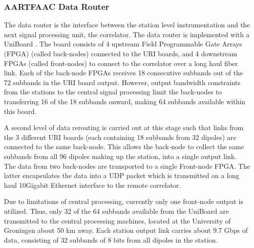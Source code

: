 \documentclass{ws-jai}
\begin{document}
\subsubsection {\label {sec:afaac_unb} AARTFAAC  Data Router}
The data router  is the interface between the station  level instrumentation and
the next signal processing unit, the correlator.  The data router is implemented
with a UniBoard \citep{gunst2014application}.  The  board consists of 4 upstream
Field Programmable Gate  Arrays (FPGA) (called back-nodes) connected  to the URI
boards, and 4 downstream FPGAs (called front-nodes) to connect to the correlator
over  a  long  haul  fiber  link.   Each of  the  back-node  FPGAs  receives  18
consecutive subbands out  of the 72 subbands in the  URI board output.  However,
output bandwidth constraints from the  stations to the central signal processing
limit the  back-nodes to transferring  16 of the  18 subbands onward,  making 64
subbands available within this board.

A second level  of data rerouting is  carried out at this stage  such that links
from the  3 different URI boards  (each containing 18 subbands  from 32 dipoles)
are connected to  the same back-node.  This allows the  back-node to collect the
same subbands from  all 96 dipoles making  up the station, into  a single output
link.  The data from two back-nodes are transported to a single Front-node FPGA.
The latter  encapsulates the data  into a UDP packet  which is transmitted  on a
long  haul 10Gigabit  Ethernet interface  to  the remote  correlator.  

Due to limitations  of central processing, currently only  one front-node output
is utilized. Thus,  only 32 of the  64 subbands available from  the UniBoard are
transmitted to  the central  processing machines, located  at the  University of
Groningen about 50 km away.  Each station  output link carries about 9.7 Gbps of
data, consisting of 32 subbands of 8 bits from all dipoles in the station.\\

\end{document}
